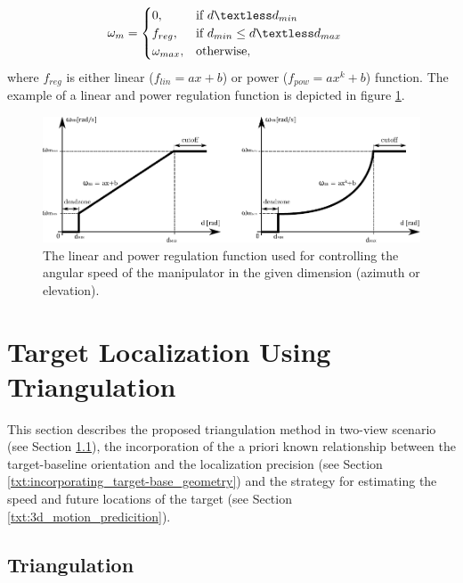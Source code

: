 \begin{align}
	\omega_{m} &=
	\begin{cases}
		0,  & \text{if}\ d \textless d_{min}\\
		f_{reg},  & \text{if}\ d_{min} \leq d \textless d_{max}\\
		\omega_{max}, & \text{otherwise},
	\end{cases}
\end{align}
where $f_{reg}$ is either linear ($f_{lin} = ax+b$) or power ($f_{pow} = ax^{k}+b$) function. The example of a linear and power regulation function is depicted in figure \ref{fig:regulation_lin_power}.

\begin{figure}[htb]
	\centering
	\includegraphics[width=0.75\linewidth]{fig/regulation_linear_power.pdf}
	\caption{The linear and power regulation function used for controlling the angular speed of the manipulator in the given dimension (azimuth or elevation).}
	\label{fig:regulation_lin_power}
\end{figure}

\section{Target Localization Using Triangulation} \label{txt:target_localization_using_triangulation}

This section describes the proposed triangulation method in two-view scenario (see Section \ref{txt:triangulation}), the incorporation of the a priori known relationship between the target-baseline orientation and the localization precision (see Section \ref{txt:incorporating_target-base_geometry}) and the strategy for estimating the speed and future locations of the target (see Section \ref{txt:3d_motion_predicition}).

\subsection{Triangulation} \label{txt:triangulation}

